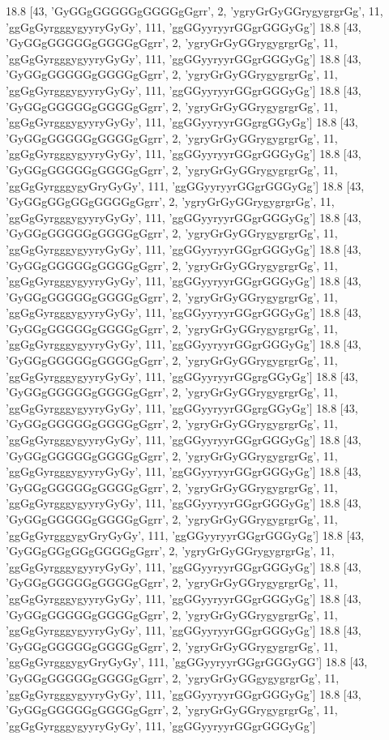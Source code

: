 18.8 [43, 'GyGGgGGGGGgGGGGgGgrr', 2, 'ygryGrGyGGrygygrgrGg', 11, 'ggGgGyrgggygyyryGyGy', 111, 'ggGGyyryyrGGgrGGGyGg']
18.8 [43, 'GyGGgGGGGGgGGGGgGgrr', 2, 'ygryGrGyGGrygygrgrGg', 11, 'ggGgGyrgggygyyryGyGy', 111, 'ggGGyyryyrGGgrGGGyGg']
18.8 [43, 'GyGGgGGGGGgGGGGgGgrr', 2, 'ygryGrGyGGrygygrgrGg', 11, 'ggGgGyrgggygyyryGyGy', 111, 'ggGGyyryyrGGgrGGGyGg']
18.8 [43, 'GyGGgGGGGGgGGGGgGgrr', 2, 'ygryGrGyGGrygygrgrGg', 11, 'ggGgGyrgggygyyryGyGy', 111, 'ggGGyyryyrGGgrgGGyGg']
18.8 [43, 'GyGGgGGGGGgGGGGgGgrr', 2, 'ygryGrGyGGrygygrgrGg', 11, 'ggGgGyrgggygyyryGyGy', 111, 'ggGGyyryyrGGgrGGGyGg']
18.8 [43, 'GyGGgGGGGGgGGGGgGgrr', 2, 'ygryGrGyGGrygygrgrGg', 11, 'ggGgGyrgggygyGryGyGy', 111, 'ggGGyyryyrGGgrGGGyGg']
18.8 [43, 'GyGGgGGgGGgGGGGgGgrr', 2, 'ygryGrGyGGrygygrgrGg', 11, 'ggGgGyrgggygyyryGyGy', 111, 'ggGGyyryyrGGgrGGGyGg']
18.8 [43, 'GyGGgGGGGGgGGGGgGgrr', 2, 'ygryGrGyGGrygygrgrGg', 11, 'ggGgGyrgggygyyryGyGy', 111, 'ggGGyyryyrGGgrGGGyGg']
18.8 [43, 'GyGGgGGGGGgGGGGgGgrr', 2, 'ygryGrGyGGrygygrgrGg', 11, 'ggGgGyrgggygyyryGyGy', 111, 'ggGGyyryyrGGgrGGGyGg']
18.8 [43, 'GyGGgGGGGGgGGGGgGgrr', 2, 'ygryGrGyGGrygygrgrGg', 11, 'ggGgGyrgggygyyryGyGy', 111, 'ggGGyyryyrGGgrGGGyGg']
18.8 [43, 'GyGGgGGGGGgGGGGgGgrr', 2, 'ygryGrGyGGrygygrgrGg', 11, 'ggGgGyrgggygyyryGyGy', 111, 'ggGGyyryyrGGgrGGGyGg']
18.8 [43, 'GyGGgGGGGGgGGGGgGgrr', 2, 'ygryGrGyGGrygygrgrGg', 11, 'ggGgGyrgggygyyryGyGy', 111, 'ggGGyyryyrGGgrgGGyGg']
18.8 [43, 'GyGGgGGGGGgGGGGgGgrr', 2, 'ygryGrGyGGrygygrgrGg', 11, 'ggGgGyrgggygyyryGyGy', 111, 'ggGGyyryyrGGgrgGGyGg']
18.8 [43, 'GyGGgGGGGGgGGGGgGgrr', 2, 'ygryGrGyGGrygygrgrGg', 11, 'ggGgGyrgggygyyryGyGy', 111, 'ggGGyyryyrGGgrGGGyGg']
18.8 [43, 'GyGGgGGGGGgGGGGgGgrr', 2, 'ygryGrGyGGrygygrgrGg', 11, 'ggGgGyrgggygyyryGyGy', 111, 'ggGGyyryyrGGgrGGGyGg']
18.8 [43, 'GyGGgGGGGGgGGGGgGgrr', 2, 'ygryGrGyGGrygygrgrGg', 11, 'ggGgGyrgggygyyryGyGy', 111, 'ggGGyyryyrGGgrGGGyGg']
18.8 [43, 'GyGGgGGGGGgGGGGgGgrr', 2, 'ygryGrGyGGrygygrgrGg', 11, 'ggGgGyrgggygyGryGyGy', 111, 'ggGGyyryyrGGgrGGGyGg']
18.8 [43, 'GyGGgGGgGGgGGGGgGgrr', 2, 'ygryGrGyGGrygygrgrGg', 11, 'ggGgGyrgggygyyryGyGy', 111, 'ggGGyyryyrGGgrGGGyGg']
18.8 [43, 'GyGGgGGGGGgGGGGgGgrr', 2, 'ygryGrGyGGrygygrgrGg', 11, 'ggGgGyrgggygyyryGyGy', 111, 'ggGGyyryyrGGgrGGGyGg']
18.8 [43, 'GyGGgGGGGGgGGGGgGgrr', 2, 'ygryGrGyGGrygygrgrGg', 11, 'ggGgGyrgggygyyryGyGy', 111, 'ggGGyyryyrGGgrGGGyGg']
18.8 [43, 'GyGGgGGGGGgGGGGgGgrr', 2, 'ygryGrGyGGrygygrgrGg', 11, 'ggGgGyrgggygyGryGyGy', 111, 'ggGGyyryyrGGgrGGGyGG']
18.8 [43, 'GyGGgGGGGGgGGGGgGgrr', 2, 'ygryGrGyGGgygygrgrGg', 11, 'ggGgGyrgggygyyryGyGy', 111, 'ggGGyyryyrGGgrGGGyGg']
18.8 [43, 'GyGGgGGGGGgGGGGgGgrr', 2, 'ygryGrGyGGrygygrgrGg', 11, 'ggGgGyrgggygyyryGyGy', 111, 'ggGGyyryyrGGgrGGGyGg']
